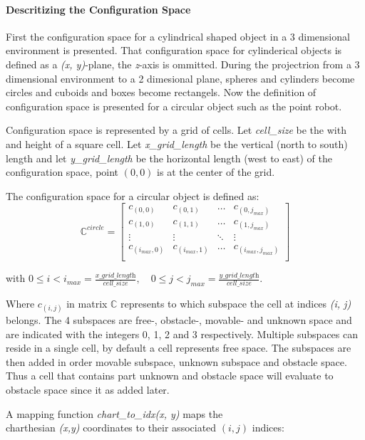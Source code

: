 \paragraph{Descritizing the Configuration Space}
First the configuration space for a cylindrical shaped object in a 3 dimensional environment is presented. That configuration space for cylinderical objects is defined as a \textit{(x, y)}-plane, the \textit{z}-axis is ommitted. During the projectrion from a 3 dimensional environment to a 2 dimesional plane, spheres and cylinders become circles and cuboids and boxes become rectangels. Now the definition of configuration space is presented for a circular object such as the point robot.\bs

Configuration space is represented by a grid of cells. Let \textit{cell\_size} be the with and height of a square cell. Let \textit{x\_grid\_length} be the vertical (north to south) length and let \textit{y\_grid\_length} be the horizontal length (west to east) of the configuration space, point $(0, 0)$ is at the center of the grid.\bs

The configuration space for a circular object is defined as:\bs
\[ \mathbb{C}^{\textit{circle}} = 
\begin{bmatrix}
  c_{(0,0)} & c_{(0,1)} & \hdots & c_{(0,j_{max})}\\
  c_{(1,0)} & c_{(1,1)} & \hdots & c_{(1,j_{max})}\\
  \vdots &  \vdots & \ddots & \vdots\\
  c_{(i_{max},0)} & c_{(i_{max},1)} & \hdots & c_{(i_{max},j_{max})}\\
\end{bmatrix}
\]

with $0 \leq i < i_{max} = \frac{\textit{x\_grid\_length}}{\textit{cell\_size}}, \quad 0 \leq j < j_{max} = \frac{\textit{y\_grid\_length}}{\textit{cell\_size}}$.\bs

Where $c_{(i,j)}$ in matrix $\mathbb{C}$ represents to which subspace the cell at indices \textit{(i, j)} belongs. The 4 subspaces are free-, obstacle-, movable- and unknown space and are indicated with the integers 0, 1, 2 and 3 respectively. Multiple subspaces can reside in a single cell, by default a cell represents free space. The subspaces are then added in order movable subspace, unknown subspace and obstacle space. Thus a cell that contains part unknown and obstacle space will evaluate to obstacle space since it as added later.\bs

A mapping function \textit{chart\_to\_idx(x, y)} maps the\\charthesian \textit{(x,y)} coordinates to their associated $(i,j)$ indices:

